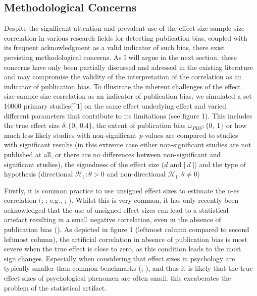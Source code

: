 \documentclass[
  12pt,
]{scrartcl}
\begin{document}
\subsection{Methodological Concerns}\label{methodological-concerns}

Despite the significant attention and prevalent use of the effect
size-sample size correlation in various research fields for detecting
publication bias, coupled with its frequent acknowledgment as a valid
indicator of such bias, there exist persisting methodological concerns.
As I will argue in the next section, these concerns have only been
partially discussed and adressed in the existing literature and may
compromise the validity of the interpretation of the correlation as an
indicator of publication bias. To illustrate the inherent challenges of
the effect size-sample size correlation as an indicator of publication
bias, we simulated a set 10000 primary studies{[}\^{}1{]} on the same
effect underlying effect and varied different parameters that contribute
to its limitations (see figure 1). This includes the true effect size
\(\delta: \{0,~0.4\}\), the extent of publication bias
\(\omega_{PBS}:\{0,~1\}\) or how much less likely studies with
non-significant \emph{p}-values are compared to studies with significant
results (in this extreme case either non-significant studies are not
published at all, or there are no differences between non-significant
and significant studies), the signedness of the effect size (\(d\) and
\(\lvert ~ d ~ \rvert\)) and the type of hypothesis (directional
\(\mathcal{H_1}:\theta>0\) and non-directional
\(\mathcal{H_1}: \theta \neq0\))

Firstly, it is common practice to use unsigned effect sizes to estimate
the n-es correlation
(;
; e.g.,
;
). Whilst
this is very common, it has only recently been acknowledged that the use
of unsigned effect sizes can lead to a statistical artefact resulting in
a small negative correlation, even in the absence of publication bias
(). As
depicted in figure 1 (leftmost column compared to second leftmost
column), the artificial correlation in absence of publication bias is
most severe when the true effect is close to zero, as this condition
leads to the most sign changes. Especially when considering that effect
sizes in psychology are typically smaller than common benchmarks
(;
), and
thus it is likely that the true effect sizes of psychological phenomen
are often small, this excaberates the problem of the statistical
artifact.
\end{document}
